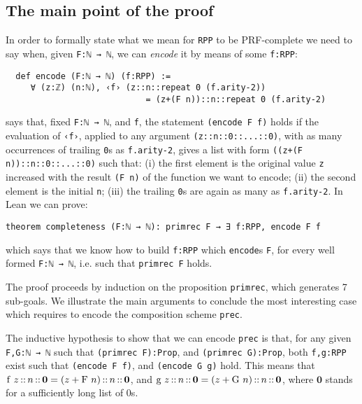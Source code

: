 \documentclass[runningheads]{llncs}
\newcommand{\PRF}{\textsf{PRF}\xspace}
\newcommand{\LEAN}{\textsf{Lean}\xspace}
\begin{document}
\subsection{The main point of the proof}
In order to formally state what we mean for \lstinline|RPP| to be \PRF-complete we need to say when, given \lstinline|F:ℕ → ℕ|, we can \emph{encode} it by means of some \lstinline|f:RPP|:
\begin{lstlisting}
  def encode (F:ℕ → ℕ) (f:RPP) :=
     ∀ (z:ℤ) (n:ℕ), ‹f› (z::n::repeat 0 (f.arity-2))
                            = (z+(F n))::n::repeat 0 (f.arity-2)
\end{lstlisting}
says that, fixed \lstinline|F:ℕ → ℕ|, and \lstinline|f|, the statement \lstinline|(encode F f)| holds if the evaluation of \lstinline|‹f›|, applied to any argument \lstinline|(z::n::0::...::0)|, with as many occurrences of trailing \lstinline|0|s as \lstinline|f.arity-2|, gives a list with form \lstinline|((z+(F n))::n::0::...::0)| such that: (i) the first element is the original value \lstinline|z| increased with the result \lstinline|(F n)| of the function we want to encode; (ii) the second element is the initial \lstinline|n|; (iii) the trailing \lstinline|0|s are again as many as \lstinline|f.arity-2|. In \LEAN we can prove:
\begin{lstlisting}
theorem completeness (F:ℕ → ℕ): primrec F → ∃ f:RPP, encode F f
\end{lstlisting}
which says that we know how to build \lstinline|f:RPP| which \lstinline|encode|s \lstinline|F|, for every well formed \lstinline|F:ℕ → ℕ|, i.e. such that \lstinline|primrec F| holds.

The proof proceeds by induction on the proposition \lstinline|primrec|, which generates 7 sub-goals. We illustrate the main arguments to conclude the most interesting case which requires to encode the composition scheme \lstinline|prec|.

The inductive hypothesis to show that we can encode \lstinline|prec| is that, for any given \lstinline|F,G:ℕ → ℕ| such that \lstinline|(primrec F):Prop|, and \lstinline|(primrec G):Prop|, both \lstinline|f,g:RPP| exist such that \lstinline|(encode F f)|, and \lstinline|(encode G g)| hold. This means that
$ \mbox{\lstinline|f|}\ z\mbox{\lstinline|::|}n\mbox{\lstinline|::|}\boldsymbol{0} =
(z+\mbox{\lstinline|F|}\ n)\mbox{\lstinline|::|}n\mbox{\lstinline|::|}\boldsymbol{0} $, and
$ \mbox{\lstinline|g|}\ z\mbox{\lstinline|::|}n\mbox{\lstinline|::|}\boldsymbol{0} =
(z+\mbox{\lstinline|G|}\ n)\mbox{\lstinline|::|}n\mbox{\lstinline|::|}\boldsymbol{0} $, where $ \boldsymbol{0} $ stands for a sufficiently long list of $ 0 $s.
\end{document}
